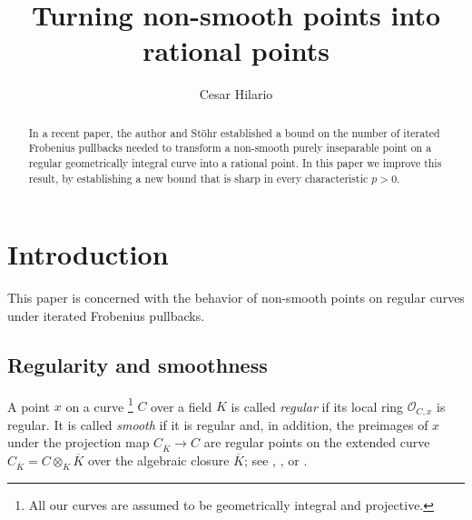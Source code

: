 \documentclass[12pt,reqno]{amsart}%
\theoremstyle{definition}
\theoremstyle{remark}
\newcommand{\ov}{\overline}
\newcommand{\OO}{\mathcal{O}}
\begin{document}
\title{Turning non-smooth points into rational points}

\author{Cesar Hilario}
\address{Departamento de Ciencias, Pontificia Universidad Cat\'olica del Per\'u, Av. Universitaria 1801, San Miguel 15088, Lima, Peru}





\begin{abstract}
In a recent paper, the author and Stöhr established a bound on the number of iterated Frobenius pullbacks needed to transform a non-smooth purely inseparable point on a regular geometrically integral curve into a rational point.
In this paper we improve this result, 
by establishing a new bound that is sharp in every characteristic $p>0$.

\end{abstract}


\maketitle



\setcounter{tocdepth}{1}


\section{Introduction}

This paper is concerned with the behavior of non-smooth points on regular curves under iterated Frobenius pullbacks.

\subsection{Regularity and smoothness}
A point $x$ on a curve%
\footnote{All our curves are assumed to be geometrically integral and projective.}
$C$ over a field $K$ is called \emph{regular} if its local ring $\OO_{C,x}$ is regular.
It is called \emph{smooth} if it is regular and, in addition, 
the preimages of $x$ under the projection map $C_{\ov K} \to C$ are regular points on the extended curve $C_{\ov K} = C \otimes_K \ov K$ over the algebraic closure $\ov K$;
see \cite[Chapt.~0, 22.5.8]{EGA4a}, \cite{Fal78}, or \cite[p.\,141]{Liu02}.
\end{document}
